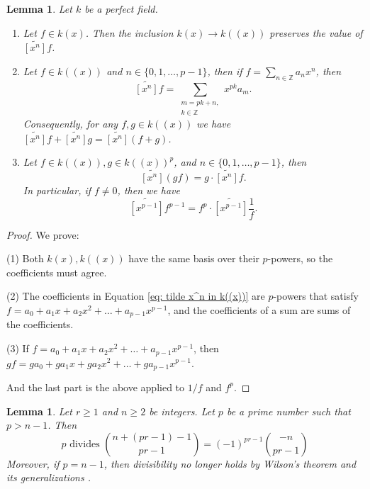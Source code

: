 \documentclass{amsart}
\newtheorem{lemma}[thm]{Lemma}
\theoremstyle{definition}
\begin{document}
\begin{lemma}
    Let $k$ be a perfect field. 

    \begin{enumerate}
        \item Let $f\in k(x)$. Then the inclusion $k(x)\to k((x))$ preserves the value of $\widetilde{[x^{n}]}f$.
        \item Let $f\in k((x))$ and $n\in \{0,1,\ldots,p-1\}$, then if $f=\sum_{n\in \mathbb{Z}} a_n x^n$, then
        \begin{equation}\label{eq: tilde x^n in k((x))}
            \widetilde{[x^{n}]}f = \sum_{\substack{m=pk+n,\\ k\in \mathbb{Z}}} x^{pk}a_m.
        \end{equation}
        Consequently, for any $f,g\in k((x))$ we have $\widetilde{[x^{n}]}f+\widetilde{[x^{n}]}g=\widetilde{[x^{n}]}(f+g)$.
        \item Let $f\in k((x)), g\in k((x))^p$, and $n\in \{0,1,\ldots,p-1\}$, then
        \begin{equation}
        \widetilde{[x^{n}]}(gf)=g \cdot \widetilde{[x^{n}]}f.
        \end{equation}
        In particular, if $f\ne0$, then we have
        \begin{equation}\label{eq: trick fp 1/f}
        \widetilde{[x^{p-1}]}f^{p-1}=f^p \cdot \widetilde{[x^{p-1}]}\frac{1}{f}.
        \end{equation}
    \end{enumerate}
\end{lemma}

\begin{proof} We prove:

    (1) Both $k(x),k((x))$ have the same basis over their $p$-powers, so the coefficients must agree.

    (2) The coefficients in Equation \ref{eq: tilde x^n in k((x))} are $p$-powers that satisfy $f=a_0+a_1x+a_2x^2+\ldots+a_{p-1}x^{p-1}$, and the coefficients of a sum are sums of the coefficients.

    (3) If $f=a_0+a_1x+a_2x^2+\ldots+a_{p-1}x^{p-1}$, then $gf=ga_0+ga_1x+ga_2x^2+\ldots+ga_{p-1}x^{p-1}$. 
    
    And the last part is the above applied to $1/f$ and $f^p$.
\end{proof}

\begin{lemma}\label{lem: n>=2 coeff is zero}
    Let $r\ge 1$ and $n\ge 2$ be integers. Let $p$ be a prime number such that $p>n-1$.
    Then
    \[
    p \text{ divides } \binom{n+(pr-1)-1}{pr-1}={(-1)}^{pr-1}\binom{-n}{pr-1}
    \]
    Moreover, if $p=n-1$, then divisibility no longer holds by Wilson's theorem and its generalizations \cite{Wolstenholme_theorem_history}.
\end{lemma}
\end{document}
